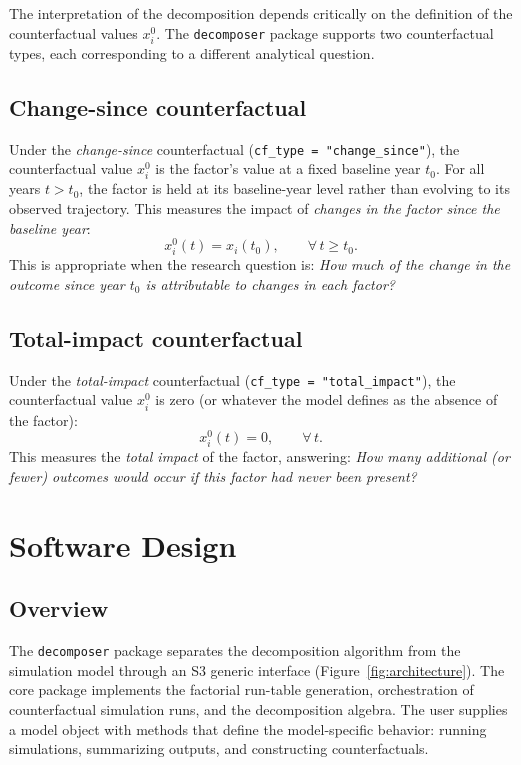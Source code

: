 \documentclass[11pt]{article}
\newcommand{\pkg}[1]{\texttt{#1}}
\newcommand{\code}[1]{\texttt{#1}}
\begin{document}
The interpretation of the decomposition depends critically on the
definition of the counterfactual values $x_i^0$.
The \pkg{decomposer} package supports two counterfactual types, each
corresponding to a different analytical question.

\subsection{Change-since counterfactual}

Under the \emph{change-since} counterfactual (\code{cf\_type =
"change\_since"}), the counterfactual value $x_i^0$ is the factor's
value at a fixed baseline year $t_0$.
For all years $t > t_0$, the factor is held at its baseline-year level
rather than evolving to its observed trajectory.
This measures the impact of \emph{changes in the factor since the
baseline year}:
\[
  x_i^0(t) = x_i(t_0), \qquad \forall\, t \geq t_0.
\]
This is appropriate when the research question is:
\emph{How much of the change in the outcome since year $t_0$ is
attributable to changes in each factor?}

\subsection{Total-impact counterfactual}

Under the \emph{total-impact} counterfactual (\code{cf\_type =
"total\_impact"}), the counterfactual value $x_i^0$ is zero (or
whatever the model defines as the absence of the factor):
\[
  x_i^0(t) = 0, \qquad \forall\, t.
\]
This measures the \emph{total impact} of the factor, answering:
\emph{How many additional (or fewer) outcomes would occur if this factor
had never been present?}


\section{Software Design}
\label{sec:software}

\subsection{Overview}

The \pkg{decomposer} package separates the decomposition algorithm from
the simulation model through an S3 generic interface (Figure~\ref{fig:architecture}).
The core package implements the factorial run-table generation,
orchestration of counterfactual simulation runs, and the decomposition
algebra.
The user supplies a model object with methods that define the
model-specific behavior: running simulations, summarizing outputs, and
constructing counterfactuals.
\end{document}
